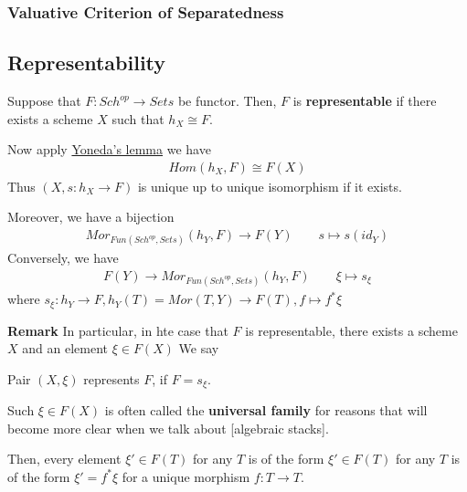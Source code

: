 \documentclass[Total.tex]{subfiles}
\begin{document}
			\subsubsection{Valuative Criterion of Separatedness}
		
		\subsection{Representability}
			\begin{Def}
				Suppose that $F:Sch^{op}\rightarrow Sets$ be functor. Then, $F$ is \textbf{representable} if there exists a scheme $X$ such that $h_X\cong F$.
			\end{Def}
			Now apply \underline{Yoneda's lemma} we have
			\begin{gather*}
				Hom(h_X,F)\cong F(X)
			\end{gather*}
			Thus $(X,s:h_X\rightarrow F)$ is unique up to unique isomorphism if it exists.
			
			Moreover, we have a bijection
			\begin{gather*}
				Mor_{Fun(Sch^{op},Sets)}(h_Y,F)\rightarrow F(Y)\qquad s\mapsto s(id_Y)
			\end{gather*}
			Conversely, we have
			\begin{gather*}
				F(Y)\rightarrow Mor_{Fun(Sch^{op},Sets)}(h_Y,F)\qquad \xi\mapsto s_\xi
			\end{gather*}
			where $s_\xi:h_Y\rightarrow F,h_Y(T)=Mor(T,Y)\rightarrow F(T),f\mapsto f^*\xi$
			
			\textbf{Remark} In particular, in hte case that $F$ is representable, there exists a scheme $X$ and an element $\xi\in F(X)$ We say
			\begin{Def}
				Pair $(X,\xi)$ represents $F$, if $F=s_\xi$.
			\end{Def}
			
			\begin{Def}
				Such $\xi\in F(X)$ is often called the \textbf{universal family} for reasons that will become more clear when we talk about [algebraic stacks].
			\end{Def}
			
			Then, every element $\xi'\in F(T)$ for any $T$ is of the form $\xi'\in F(T)$ for any $T$ is of the form $\xi'=f^*\xi$ for a unique morphism $f:T\rightarrow T$.
			
\end{document}
